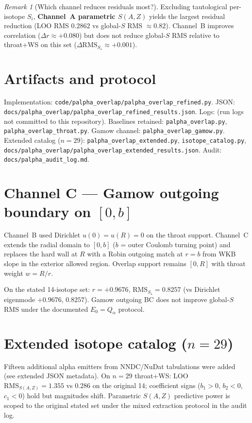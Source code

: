 \documentclass[11pt,a4paper]{article}
\theoremstyle{remark}
\newtheorem*{remark}{Remark}
\begin{document}
\begin{remark}[Which channel reduces residuals most?]
Excluding tautological per-isotope $S_i$, \textbf{Channel~A parametric
$S(A,Z)$} yields the largest residual reduction (LOO RMS $0.2862$ vs
global-$S$ RMS $\approx 0.82$).  Channel~B improves correlation
($\Delta r\approx +0.080$) but does not reduce global-$S$ RMS relative
to throat+WS on this set ($\Delta\mathrm{RMS}_{S_\star}\approx +0.001$).
\end{remark}

\section{Artifacts and protocol}

Implementation:
\nolinkurl{code/palpha_overlap/palpha_overlap_refined.py}.
JSON:
\nolinkurl{docs/palpha_overlap/palpha_overlap_refined_results.json}.
Logs:
(run logs not committed to this repository).
Baselines retained:
\texttt{palpha\_overlap.py}, \texttt{palpha\_overlap\_throat.py}.
Gamow channel: \texttt{palpha\_overlap\_gamow.py}.
Extended catalog ($n=29$): \nolinkurl{palpha_overlap_extended.py},
\texttt{isotope\_catalog.py}, \nolinkurl{docs/palpha_overlap/palpha_overlap_extended_results.json}.
Audit: \texttt{docs/palpha\_audit\_log.md}.

\section{Channel C --- Gamow outgoing boundary on \texorpdfstring{$[0,b]$}{[0,b]}}

Channel~B used Dirichlet $u(0)=u(R)=0$ on the throat support.
Channel~C extends the radial domain to $[0,b]$ ($b$ = outer Coulomb
turning point) and replaces the hard wall at $R$ with a Robin outgoing
match at $r=b$ from WKB slope in the exterior allowed region.
Overlap support remains $[0,R]$ with throat weight $w=R/r$.

On the stated 14-isotope set: $r=+0.9676$, $\mathrm{RMS}_{S_\star}=0.8257$
(vs Dirichlet eigenmode $+0.9676$, $0.8257$).  Gamow outgoing BC does
not improve global-$S$ RMS under the documented $E_0=Q_\alpha$ protocol.

\section{Extended isotope catalog (\texorpdfstring{$n=29$}{n=29})}

Fifteen additional alpha emitters from NNDC/NuDat tabulations were added
(see extended JSON metadata).  On $n=29$ throat+WS:
LOO $\mathrm{RMS}_{S(A,Z)}=1.355$ vs $0.286$ on the original 14;
coefficient signs ($b_1>0$, $b_2<0$, $c_1<0$) hold but magnitudes shift.
Parametric $S(A,Z)$ predictive power is scoped to the original stated set
under the mixed extraction protocol in the audit log.
\end{document}
